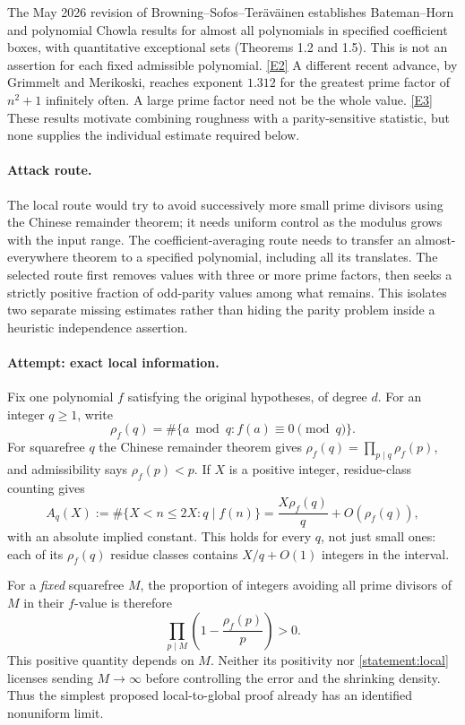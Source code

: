 \documentclass[11pt]{article}
\newcommand{\eref}[2]{\hyperlink{extra:#1:#2}{[E#2]}}
\begin{document}
The May 2026 revision of Browning--Sofos--Ter\"av\"ainen establishes
Bateman--Horn and polynomial Chowla results for almost all polynomials in
specified coefficient boxes, with quantitative exceptional sets
(Theorems 1.2 and 1.5). This is not an assertion for each fixed admissible
polynomial. \eref{statement}{2}
A different recent advance, by Grimmelt and Merikoski, reaches exponent
$1.312$ for the greatest prime factor of $n^2+1$ infinitely often. A large
prime factor need not be the whole value. \eref{statement}{3}
These results motivate combining roughness with a parity-sensitive statistic,
but none supplies the individual estimate required below.

\paragraph{Attack route.}
The local route would try to avoid successively more small prime divisors
using the Chinese remainder theorem; it needs uniform control as the modulus
grows with the input range. The coefficient-averaging route needs to transfer
an almost-everywhere theorem to a specified polynomial, including all its
translates. The selected route first removes values with three or more prime
factors, then seeks a strictly positive fraction of odd-parity values among
what remains. This isolates two separate missing estimates rather than hiding
the parity problem inside a heuristic independence assertion.

\paragraph{Attempt: exact local information.}
Fix one polynomial $f$ satisfying the original hypotheses, of degree $d$.
For an integer $q\ge1$, write
\[
 \rho_f(q)=\#\{a\bmod q:f(a)\equiv0\pmod q\}.
\]
For squarefree $q$ the Chinese remainder theorem gives
$\rho_f(q)=\prod_{p\mid q}\rho_f(p)$, and admissibility says
$\rho_f(p)<p$. If $X$ is a positive integer, residue-class counting gives
\begin{equation}\label{statement:local}
 A_q(X):=\#\{X<n\le2X:q\mid f(n)\}
       =\frac{X\rho_f(q)}q+O(\rho_f(q)),
\end{equation}
with an absolute implied constant. This holds for every $q$, not just small
ones: each of its $\rho_f(q)$ residue classes contains $X/q+O(1)$ integers
in the interval.

For a \emph{fixed} squarefree $M$, the proportion of integers avoiding all
prime divisors of $M$ in their $f$-value is therefore
\[
 \prod_{p\mid M}\left(1-\frac{\rho_f(p)}p\right)>0.
\]
This positive quantity depends on $M$. Neither its positivity nor
\eqref{statement:local} licenses sending $M\to\infty$ before controlling the
error and the shrinking density. Thus the simplest proposed local-to-global
proof already has an identified nonuniform limit.
\end{document}
